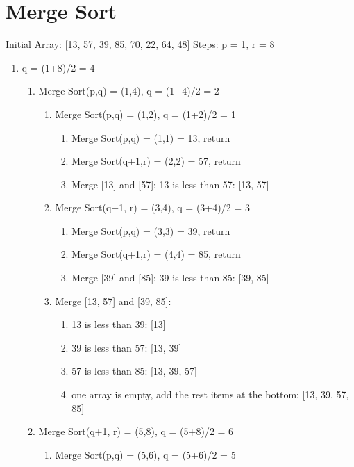 \documentclass[12pt]{article}
\begin{document}
\section{Merge Sort}
Initial Array: [13, 57, 39, 85, 70, 22, 64, 48]
\newline
Steps: p = 1, r = 8
\begin{enumerate}
    \item q = (1+8)/2 = 4 \begin{enumerate}
        \item Merge Sort(p,q) = (1,4), q = (1+4)/2 = 2 \begin{enumerate}
            \item Merge Sort(p,q) = (1,2), q = (1+2)/2 = 1 \begin{enumerate}
                \item Merge Sort(p,q) = (1,1) = 13, return
                \item Merge Sort(q+1,r) = (2,2) = 57, return
                \item Merge [13] and [57]: 13 is less than 57: [13, 57]
            \end{enumerate}
            \item Merge Sort(q+1, r) = (3,4), q = (3+4)/2 = 3 \begin{enumerate}
                \item Merge Sort(p,q) = (3,3) = 39, return
                \item Merge Sort(q+1,r) = (4,4) = 85, return
                \item Merge [39] and [85]: 39 is less than 85: [39, 85]
            \end{enumerate}
            \item Merge [13, 57] and [39, 85]: \begin{enumerate}
                \item 13 is less than 39: [13]
                \item 39 is less than 57: [13, 39]
                \item 57 is less than 85: [13, 39, 57]
                \item one array is empty, add the rest items at the bottom: [13, 39, 57, 85]
            \end{enumerate}
        \end{enumerate}
        \item Merge Sort(q+1, r) = (5,8), q = (5+8)/2 = 6 \begin{enumerate}
            \item Merge Sort(p,q) = (5,6), q = (5+6)/2 = 5 \begin{enumerate}

\end{enumerate}
\end{enumerate}
\end{enumerate}
\end{enumerate}
\end{document}
